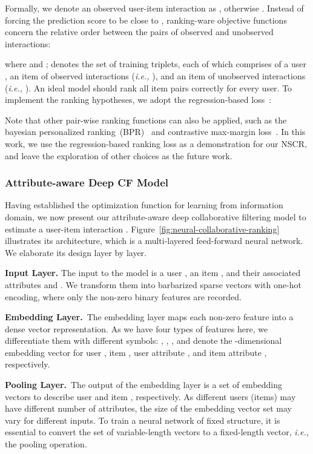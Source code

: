 \documentclass[sigconf]{acmart}
\newcommand{\ie}{\emph{i.e., }}
\begin{document}
Formally, we denote an observed user-item interaction as , otherwise . Instead of forcing the prediction score  to be close to , ranking-ware objective functions concern the relative order between the pairs of observed and unobserved interactions:

where  and ;  denotes the set of training triplets, each of which comprises of a user , an item  of observed interactions (\ie ), and an item  of unobserved interactions (\ie ). An ideal model should rank all  item pairs correctly for every user. To implement the ranking hypotheses, we adopt the regression-based loss~\cite{RankALS}:

\noindent Note that other pair-wise ranking functions can also be applied, such as the bayesian personalized ranking~(BPR)~\cite{chen2017acf,DBLP:conf/uai/RendleFGS09} and contrastive max-margin loss~\cite{DBLP:conf/nips/SocherCMN13}. In this work, we use the regression-based ranking loss as a demonstration for our NSCR, and leave the exploration of other choices as the future work.

\subsubsection{\textbf{Attribute-aware Deep CF Model}}\label{sec:representation-learning}
Having established the optimization function for learning from information domain, we now present our attribute-aware deep collaborative filtering model to estimate a user-item interaction . Figure~\ref{fig:neural-collaborative-ranking} illustrates its architecture, which is a multi-layered feed-forward neural network. We elaborate its design layer by layer.



\textbf{Input Layer.} The input to the model is a user , an item , and their associated attributes  and . We transform them into barbarized sparse vectors with one-hot encoding, where only the non-zero binary features are recorded.


\textbf{Embedding Layer.}~The embedding layer maps each non-zero feature into a dense vector representation. As we have four types of features here, we differentiate them with different symbols: , , , and  denote the -dimensional embedding vector for user , item , user attribute , and item attribute , respectively.

\textbf{Pooling Layer.}~The output of the embedding layer is a set of embedding vectors to describe user  and item , respectively. As different users (items) may have different number of attributes, the size of the embedding vector set may vary for different inputs. To train a neural network of fixed structure, it is essential to convert the set of variable-length vectors to a fixed-length vector, \ie the pooling operation.
\end{document}

